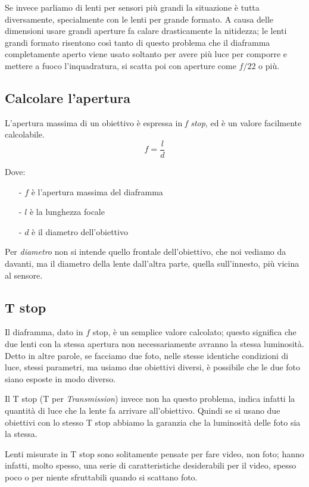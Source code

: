 Se invece parliamo di lenti per sensori più grandi la situazione è tutta diversamente, specialmente con le lenti per grande formato. A causa delle dimensioni usare grandi aperture fa calare drasticamente la nitidezza; le lenti grandi formato risentono così tanto di questo problema che il diaframma completamente aperto viene usato soltanto per avere più luce per comporre e mettere a fuoco l'inquadratura, si scatta poi con aperture come $f/22$ o più.


\subsection{Calcolare l'apertura} \label{subsec:calcolareapertura}
L'apertura massima di un obiettivo è espressa in \textit{f stop}, ed è un valore facilmente calcolabile.
\begin{equation}
    f = \dfrac{l}{d}
\end{equation}

Dove:
\begin{itemize}
    \item[-] $f$ è l'apertura massima del diaframma
    \item[-] $l$ è la lunghezza focale 
    \item[-] $d$ è il diametro dell'obiettivo 
\end{itemize}
Per \textit{diametro} non si intende quello frontale dell'obiettivo, che noi vediamo da davanti, ma il diametro della lente dall'altra parte, quella sull'innesto, più vicina al sensore.


\subsection{T stop} \label{subsec:tstop}
Il diaframma, dato in $f$ stop, è un semplice valore calcolato; questo significa che due lenti con la stessa apertura non necessariamente avranno la stessa luminosità.
Detto in altre parole, se facciamo due foto, nelle stesse identiche condizioni di luce, stessi parametri, ma usiamo due obiettivi diversi, è possibile che le due foto siano esposte in modo diverso.

Il T stop (T per \textit{Transmission}) invece non ha questo problema, indica infatti la quantità di luce che la lente fa arrivare all'obiettivo.
Quindi se si usano due obiettivi con lo stesso T stop abbiamo la garanzia che la luminosità delle foto sia la stessa.

Lenti misurate in T stop sono solitamente pensate per fare video, non foto; hanno infatti, molto spesso, una serie di caratteristiche desiderabili per il video, spesso poco o per niente sfruttabili quando si scattano foto.

